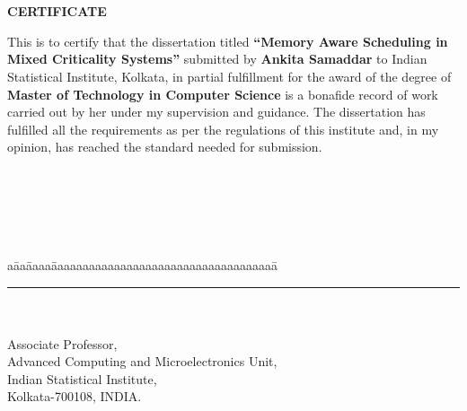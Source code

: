 \chapter*{}
{\thispagestyle{empty}
\begin{center}
\vspace*{-.6in}
{\Large \bf CERTIFICATE} 
\end{center}
\vspace{0.8in}
\hspace{0.5in}

{\noindent \large
This is to certify that the dissertation titled {\bf ``Memory Aware Scheduling in Mixed Criticality Systems''}
submitted by {\bf Ankita Samaddar} to Indian Statistical Institute, Kolkata, 
in partial fulfillment for the award of the degree of 
{\bf Master of Technology in Computer Science} is a bonafide record of work carried out by 
her under my supervision and guidance. The dissertation has fulfilled all the 
requirements as per the regulations of this institute and, in my opinion, has 
reached the standard needed for submission.\\\\\\\\\\\\

\begin{tabbing}
a\=aa\=aaaa\=aaaaaaaaaaaaaaaaaaaaaaaaaaaaaaaaaaaa\= \kill
\>\rule[.2em]{25em}{0.5pt}~\\
\\
\>Associate Professor,\\
\>Advanced Computing and Microelectronics Unit,\\
\>Indian Statistical Institute,\\
\>Kolkata-700108, INDIA.\\
\end {tabbing}
}
}
